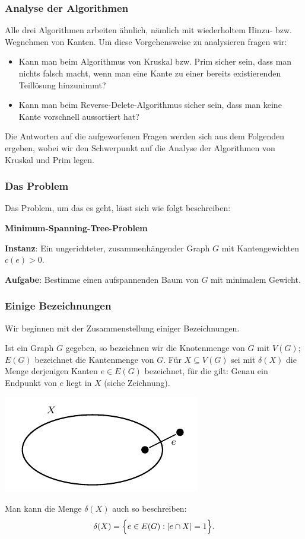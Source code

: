 \documentclass[smaller]{beamer}
\begin{document}
\begin{frame}
\frametitle{Analyse der Algorithmen}
 Alle drei Algorithmen arbeiten ähnlich, nämlich mit wiederholtem Hinzu- bzw. Wegnehmen von Kanten. Um diese Vorgehensweise zu analysieren fragen wir:
\begin{itemize}
\item Kann man beim Algorithmus von Kruskal bzw. Prim sicher sein, dass man nichts falsch macht, wenn man eine Kante zu einer bereits existierenden Teillösung hinzunimmt?
\item Kann man beim Reverse-Delete-Algorithmus sicher sein, dass man keine Kante vorschnell aussortiert hat?
\end{itemize}

Die Antworten auf die aufgeworfenen Fragen werden sich aus dem Folgenden ergeben, wobei wir den Schwerpunkt auf die Analyse der \alert{Algorithmen von Kruskal und Prim} legen.
\end{frame}

\begin{frame}
\frametitle{Das Problem}
Das Problem, um das es geht, lässt sich wie folgt beschreiben:

\medskip
\begin{center}
	\begin{minipage}{0.875\textwidth}
		\textbf{Minimum-Spanning-Tree-Problem}
		
		\medskip
		\textbf{Instanz}: Ein ungerichteter, zusammenhängender Graph $G$ mit Kantengewichten $c(e) > 0$.
		
		\medskip
		\textbf{Aufgabe}: Bestimme einen aufspannenden Baum von $G$ mit minimalem Gewicht.
	\end{minipage}
\end{center}
\end{frame}

\begin{frame}
\frametitle{Einige Bezeichnungen}
Wir beginnen mit der \alert{Zusammenstellung einiger Bezeichnungen}. \\ \vspace*{0.2cm}

Ist ein Graph $G$ gegeben, so bezeichnen wir die Knotenmenge von $G$ mit $V(G)$; $E(G)$ bezeichnet die Kantenmenge von $G$. Für $X \subseteq V(G)$ sei mit $\delta(X)$ die Menge derjenigen Kanten $e \in E(G)$ bezeichnet, für die gilt: Genau ein Endpunkt von $e$ liegt in $X$ (siehe Zeichnung).

\begin{center}
\includegraphics{fig82.pdf}
\end{center}

Man kann die Menge $\delta(X)$ auch so beschreiben:
\[
\delta(X) = \Bigl\{ e \in E(G) : |e \cap X| = 1 \Bigr\}.
\]

\end{frame}
\end{document}

